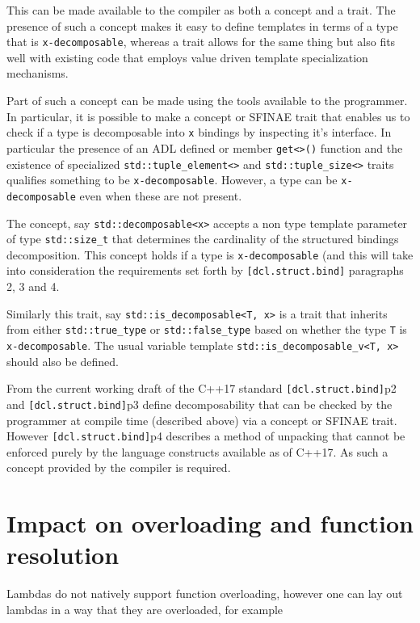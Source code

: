\documentclass{article}
\begin{document}
This can be made available to the compiler as both a concept and a trait.
The presence of such a concept makes it easy to define templates in terms of a
type that is \texttt{x-decomposable}, whereas a trait allows for the same
thing but also fits well with existing code that employs value driven template
specialization mechanisms.

Part of such a concept can be made using the tools available to the
programmer.  In particular, it is possible to make a concept or SFINAE trait
that enables us to check if a type is decomposable into \texttt{x} bindings by
inspecting it's interface.  In particular the presence of an ADL defined or
member \texttt{get<>()} function and the existence of specialized
\texttt{std::tuple\_element<>} and \texttt{std::tuple\_size<>} traits
qualifies something to be \texttt{x-decomposable}.  However, a type can be
\texttt{x-decomposable} even when these are not present.

The concept, say \texttt{std::decomposable<x>} accepts a non type template
parameter of type \texttt{std::size\_t} that determines the cardinality of the
structured bindings decomposition.  This concept holds if a type is
\texttt{x-decomposable} (and this will take into consideration the
requirements set forth by \texttt{[dcl.struct.bind]} paragraphs 2, 3 and 4.

Similarly this trait, say \texttt{std::is\_decomposable<T, x>} is a trait
that inherits from either \texttt{std::true\_type} or
\texttt{std::false\_type} based on whether the type \texttt{T} is
\texttt{x-decomposable}.  The usual variable template
\texttt{std::is\_decomposable\_v<T, x>} should also be defined.

From the current working draft of the C++17 standard
\texttt{[dcl.struct.bind]}p2 and \texttt{[dcl.struct.bind]}p3 define
decomposability that can be checked by the programmer at compile time
(described above) via a concept or SFINAE trait.  However
\texttt{[dcl.struct.bind]}p4 describes a method of unpacking that cannot be
enforced purely by the language constructs available as of C++17.  As such a
concept provided by the compiler is required.


\section{Impact on overloading and function resolution}
Lambdas do not natively support function overloading, however one can lay out
lambdas in a way that they are overloaded, for example
\end{document}
